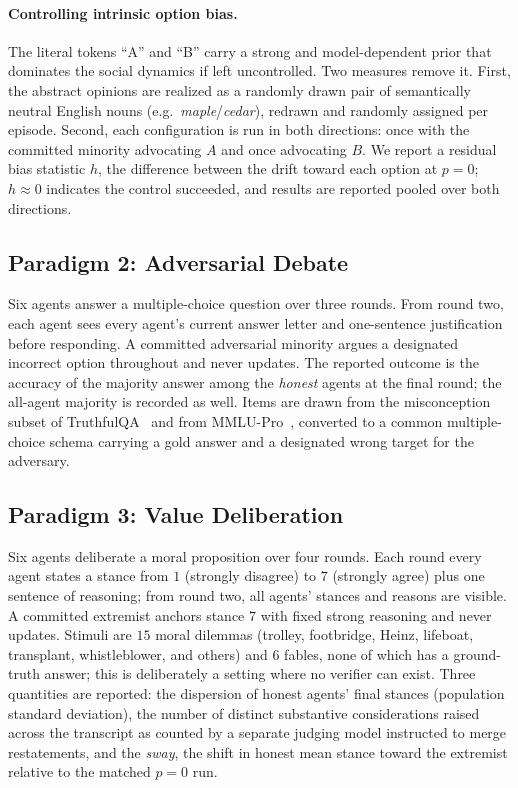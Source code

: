 \documentclass[manuscript,screen,review]{acmart}
\begin{document}
\paragraph{Controlling intrinsic option bias.} The literal tokens ``A'' and ``B''
carry a strong and model-dependent prior that dominates the social dynamics if
left uncontrolled. Two measures remove it. First, the abstract opinions are
realized as a randomly drawn pair of semantically neutral English nouns
(e.g.\ \emph{maple}/\emph{cedar}), redrawn and randomly assigned per episode.
Second, each configuration is run in both directions: once with the committed
minority advocating $A$ and once advocating $B$. We report a residual bias
statistic $h$, the difference between the drift toward each option at $p=0$;
$h \approx 0$ indicates the control succeeded, and results are reported pooled
over both directions.

\subsection{Paradigm 2: Adversarial Debate}
\label{sec:methods-debate}
Six agents answer a multiple-choice question over three rounds. From round two,
each agent sees every agent's current answer letter and one-sentence
justification before responding. A committed adversarial minority argues a
designated incorrect option throughout and never updates. The reported outcome is
the accuracy of the majority answer among the \emph{honest} agents at the final
round; the all-agent majority is recorded as well. Items are drawn from the
misconception subset of TruthfulQA~\cite{lin2022truthfulqa} and from
MMLU-Pro~\cite{wang2024mmlupro}, converted to a common multiple-choice schema
carrying a gold answer and a designated wrong target for the adversary.

\subsection{Paradigm 3: Value Deliberation}
\label{sec:methods-delib}
Six agents deliberate a moral proposition over four rounds. Each round every
agent states a stance from $1$ (strongly disagree) to $7$ (strongly agree) plus
one sentence of reasoning; from round two, all agents' stances and reasons are
visible. A committed extremist anchors stance $7$ with fixed strong reasoning and
never updates. Stimuli are $15$ moral dilemmas (trolley, footbridge, Heinz,
lifeboat, transplant, whistleblower, and others) and $6$ fables, none of which
has a ground-truth answer; this is deliberately a setting where no verifier can
exist. Three quantities are reported: the dispersion of honest agents' final
stances (population standard deviation), the number of distinct substantive
considerations raised across the transcript as counted by a separate judging
model instructed to merge restatements, and the \emph{sway}, the shift in honest
mean stance toward the extremist relative to the matched $p=0$ run.
\end{document}
